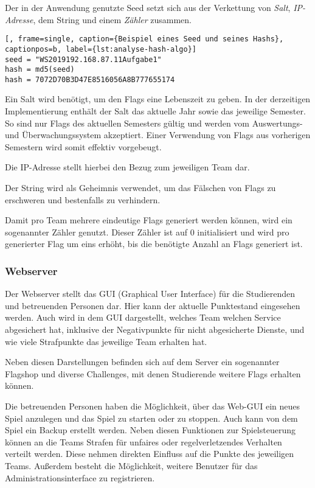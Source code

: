 Der in der Anwendung genutzte Seed setzt sich aus der Verkettung von \textit{Salt}, \textit{IP-Adresse}, dem String  und einem \textit{Zähler} zusammen.

\begin{lstlisting}[, frame=single, caption={Beispiel eines Seed und seines Hashs}, captionpos=b, label={lst:analyse-hash-algo}]
seed = "WS2019192.168.87.11Aufgabe1"
hash = md5(seed)
hash = 7072D70B3D47E8516056A8B777655174
\end{lstlisting}

Ein Salt wird benötigt, um den Flags eine Lebenszeit zu geben. In der derzeitigen Implementierung enthält der Salt das aktuelle Jahr sowie das jeweilige Semester. So sind nur Flags des aktuellen Semesters gültig und werden vom Auswertungs- und Überwachungssystem akzeptiert. Einer Verwendung von Flags aus vorherigen Semestern wird somit effektiv vorgebeugt.

Die IP-Adresse stellt hierbei den Bezug zum jeweiligen Team dar.

Der String  wird als Geheimnis verwendet, um das Fälschen von Flags zu erschweren und bestenfalls zu verhindern.

Damit pro Team mehrere eindeutige Flags generiert werden können, wird ein sogenannter Zähler genutzt. Dieser Zähler ist auf 0 initialisiert und wird pro generierter Flag um eins erhöht, bis die benötigte Anzahl an Flags generiert ist. \cite[S.48]{sosnaKonzeptionUndRealisierung2010}

\subsubsection{Webserver}\label{subsubsec:Webserver}

Der Webserver stellt das GUI (Graphical User Interface) für die Studierenden und betreuenden Personen dar. Hier kann der aktuelle Punktestand eingesehen werden. Auch wird in dem GUI dargestellt, welches Team welchen Service abgesichert hat, inklusive der Negativpunkte für nicht abgesicherte Dienste, und wie viele Strafpunkte das jeweilige Team erhalten hat.

Neben diesen Darstellungen befinden sich auf dem Server ein sogenannter Flagshop und diverse Challenges, mit denen Studierende weitere Flags erhalten können.

Die betreuenden Personen haben die Möglichkeit, über das Web-GUI ein neues Spiel anzulegen und das Spiel zu starten oder zu stoppen. Auch kann von dem Spiel ein Backup erstellt werden. Neben diesen Funktionen zur Spielsteuerung können an die Teams Strafen für unfaires oder regelverletzendes Verhalten verteilt werden. Diese nehmen direkten Einfluss auf die Punkte des jeweiligen Teams. Außerdem besteht die Möglichkeit, weitere Benutzer für das Administrationsinterface zu registrieren.

